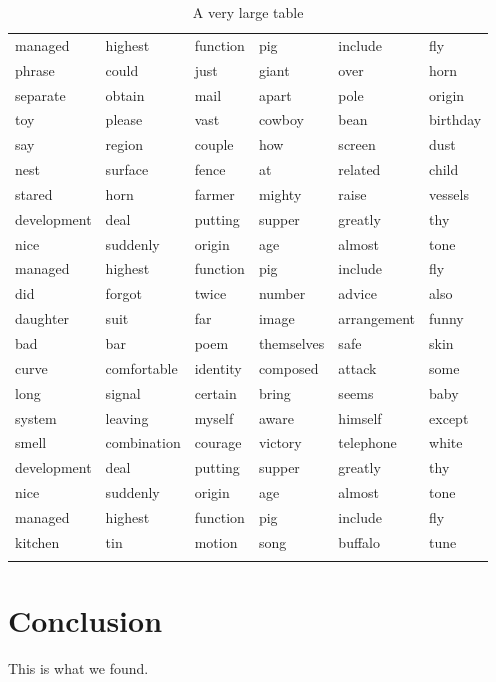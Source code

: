 \documentclass{jcls}
\begin{document}
\begin{longtable}{@{}llllll@{}}
managed     & highest     & function & pig        & include     & fly       \\
phrase      & could       & just     & giant      & over        & horn      \\
separate    & obtain      & mail     & apart      & pole        & origin    \\
toy         & please      & vast     & cowboy     & bean        & birthday  \\
say         & region      & couple   & how        & screen      & dust      \\
nest        & surface     & fence    & at         & related     & child     \\
stared      & horn        & farmer   & mighty     & raise       & vessels   \\
development & deal        & putting  & supper     & greatly     & thy       \\
nice        & suddenly    & origin   & age        & almost      & tone      \\
managed     & highest     & function & pig        & include     & fly       \\
did         & forgot      & twice    & number     & advice      & also      \\
daughter    & suit        & far      & image      & arrangement & funny     \\
bad         & bar         & poem     & themselves & safe        & skin      \\
curve       & comfortable & identity & composed   & attack      & some      \\
long        & signal      & certain  & bring      & seems       & baby      \\
system      & leaving     & myself   & aware      & himself     & except    \\
smell       & combination & courage  & victory    & telephone   & white     \\
development & deal        & putting  & supper     & greatly     & thy       \\
nice        & suddenly    & origin   & age        & almost      & tone      \\
managed     & highest     & function & pig        & include     & fly       \\
kitchen     & tin         & motion   & song       & buffalo     & tune      \\* \bottomrule
\caption{A very large table}
\end{longtable}

\section{Conclusion}

This is what we found.

%
%
%
\end{document}
